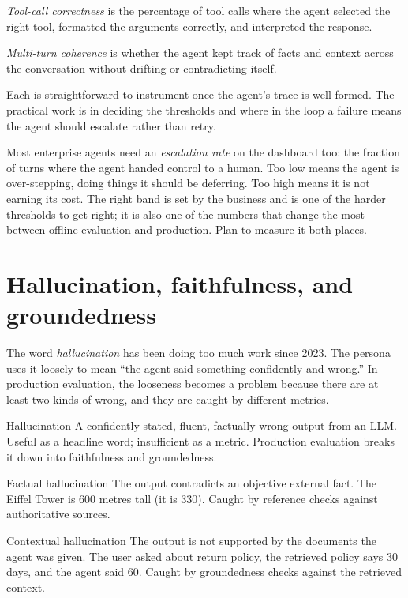 \textit{Tool-call correctness} is the percentage of tool calls where the agent selected the right tool, formatted the arguments correctly, and interpreted the response.

\textit{Multi-turn coherence} is whether the agent kept track of facts and context across the conversation without drifting or contradicting itself.

Each is straightforward to instrument once the agent's trace is well-formed. The practical work is in deciding the thresholds and where in the loop a failure means the agent should escalate rather than retry.

Most enterprise agents need an \textit{escalation rate} on the dashboard too: the fraction of turns where the agent handed control to a human. Too low means the agent is over-stepping, doing things it should be deferring. Too high means it is not earning its cost. The right band is set by the business and is one of the harder thresholds to get right; it is also one of the numbers that change the most between offline evaluation and production. Plan to measure it both places.

\section{Hallucination, faithfulness, and groundedness}

The word \textit{hallucination} has been doing too much work since 2023. The persona uses it loosely to mean ``the agent said something confidently and wrong.'' In production evaluation, the looseness becomes a problem because there are at least two kinds of wrong, and they are caught by different metrics.

\begin{TNdefinition}{Hallucination}
A confidently stated, fluent, factually wrong output from an LLM. Useful as a headline word; insufficient as a metric. Production evaluation breaks it down into faithfulness and groundedness.
\end{TNdefinition}

\begin{TNdefinition}{Factual hallucination}
The output contradicts an objective external fact. The Eiffel Tower is 600 metres tall (it is 330). Caught by reference checks against authoritative sources.
\end{TNdefinition}

\begin{TNdefinition}{Contextual hallucination}
The output is not supported by the documents the agent was given. The user asked about return policy, the retrieved policy says 30 days, and the agent said 60. Caught by groundedness checks against the retrieved context.
\end{TNdefinition}

